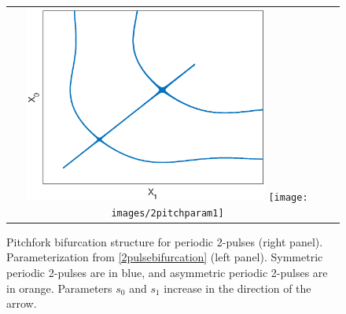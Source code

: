 \documentclass[10pt,reqno]{amsart}
\theoremstyle{plain}
\theoremstyle{definition}
\theoremstyle{remark}
\numberwithin{theorem}{section}
\numberwithin{equation}{section}
\begin{document}
\begin{figure}[H]
\begin{center}
\begin{tabular}{cc}
\includegraphics[width=8cm]{images/2pitchfork.eps}
\texttt{[image: images/2pitchparam1]}
\end{tabular}
\end{center}
\caption[Pitchfork bifurcation structure for periodic 2-pulses]{Pitchfork bifurcation structure for periodic 2-pulses (right panel). Parameterization from \cref{2pulsebifurcation} (left panel). Symmetric periodic 2-pulses are in blue, and asymmetric periodic 2-pulses are in orange. Parameters $s_0$ and $s_1$ increase in the direction of the arrow.}
\label{fig:2pitch}
\end{figure} 
\end{document}
